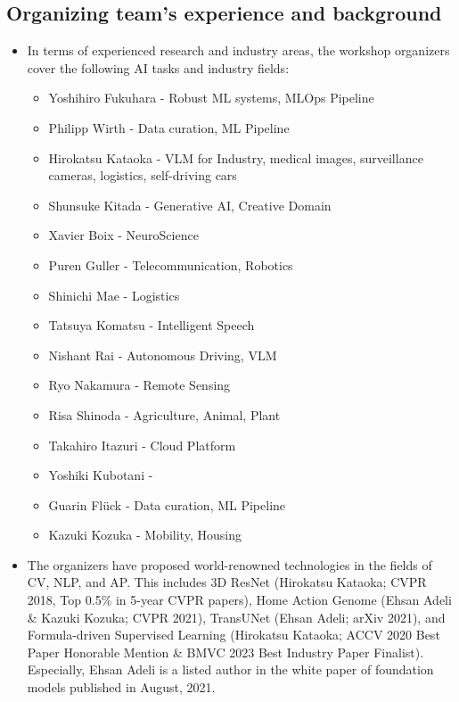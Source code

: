 \documentclass{article}
\begin{document}
\subsection{Organizing team's experience and background}
\begin{itemize}
    \item In terms of experienced research and industry areas, the workshop organizers cover the following AI tasks and industry fields:

    \begin{itemize}
        \item Yoshihiro Fukuhara - Robust ML systems, MLOps Pipeline
        \item Philipp Wirth - Data curation, ML Pipeline
        \item Hirokatsu Kataoka - VLM for Industry, medical images, surveillance cameras, logistics, self-driving cars
        \item Shunsuke Kitada - Generative AI, Creative Domain
        \item Xavier Boix - NeuroScience
        \item Puren Guller - Telecommunication, Robotics
        \item Shinichi Mae - Logistics
        \item Tatsuya Komatsu - Intelligent Speech
        \item Nishant Rai - Autonomous Driving, VLM
        \item Ryo Nakamura - Remote Sensing
        \item Risa Shinoda - Agriculture, Animal, Plant
        \item Takahiro Itazuri - Cloud Platform
        \item Yoshiki Kubotani -
        \item Guarin Flück - Data curation, ML Pipeline
        \item Kazuki Kozuka - Mobility, Housing
    \end{itemize}

    \item The organizers have proposed world-renowned technologies in the fields of CV, NLP, and AP. This includes 3D ResNet (Hirokatsu Kataoka; CVPR 2018, Top 0.5\% in 5-year CVPR papers), Home Action Genome (Ehsan Adeli \& Kazuki Kozuka; CVPR 2021), TransUNet (Ehsan Adeli; arXiv 2021), and Formula-driven Supervised Learning (Hirokatsu Kataoka; ACCV 2020 Best Paper Honorable Mention \& BMVC 2023 Best Industry Paper Finalist). Especially, Ehsan Adeli is a listed author in the white paper of foundation models published in August, 2021.


\end{itemize}
\end{document}

